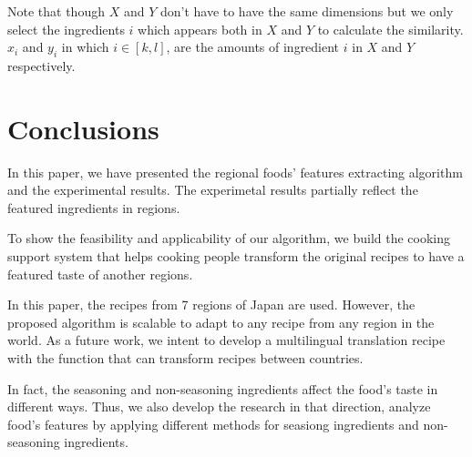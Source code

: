 \documentclass{sig-alternate}
\begin{document}
Note that though $X$ and $Y$ don't have to have the same dimensions but we only select the ingredients $i$ which appears both in $X$ and $Y$ to calculate the similarity. $x_i$ and $y_i$ in which $i \in [k,l]$, are the amounts of ingredient $i$ in $X$ and $Y$ respectively.


\section{Conclusions}

In this paper, we have presented the regional foods' features extracting algorithm and the experimental results. The experimetal results partially reflect the featured ingredients in regions. 

To show the feasibility and applicability of our algorithm, we build the cooking support system that helps cooking people transform the original recipes to have a featured taste of another regions.  

In this paper, the recipes from 7 regions of Japan are used. However, the proposed algorithm is scalable to adapt to any recipe from any region in the world. As a future work, we intent to develop a multilingual translation recipe with the function that can transform recipes between countries. 

In fact, the seasoning and non-seasoning ingredients affect the food's taste in different ways. Thus, we also develop the research in that direction, analyze food's features by applying different methods for seasiong ingredients and non-seasoning ingredients.



\end{document}
